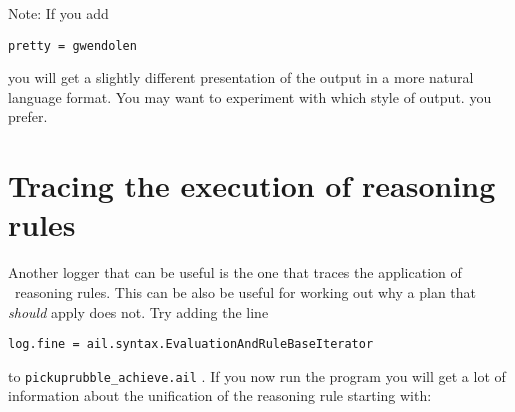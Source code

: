 Note:  If you add 
\begin{verbatim}
pretty = gwendolen
\end{verbatim}
you will get a slightly different presentation of the output in a more natural language format.  You may want to experiment with which style of output. you prefer.

\section{Tracing the execution of reasoning rules}
Another logger that can be useful is the one that traces the
application of \prolog\ reasoning rules.  This can be also be useful
for working out why a plan that \emph{should} apply does not.  Try
adding the line 
\begin{verbatim}
log.fine = ail.syntax.EvaluationAndRuleBaseIterator
\end{verbatim}
to \texttt{pickuprubble\_achieve.ail}
.  If you now run
the program you will get a lot of information about the unification of
the reasoning rule starting with: 

